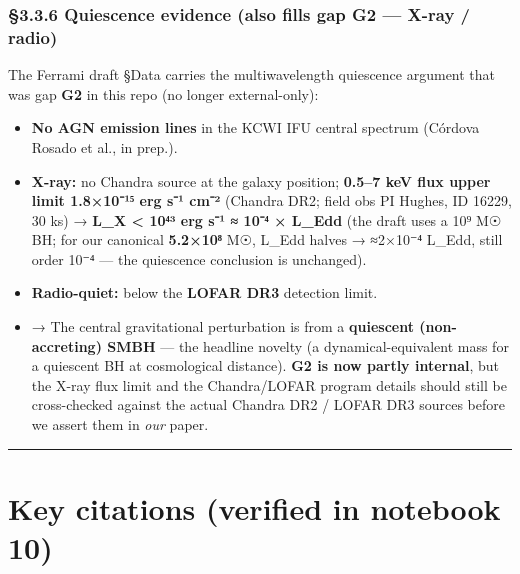 \documentclass[
]{article}
\providecommand{\tightlist}{%
  \setlength{\itemsep}{0pt}\setlength{\parskip}{0pt}}
\begin{document}
\hypertarget{quiescence-evidence-also-fills-gap-g2-x-ray-radio}{%
\subsubsection{§3.3.6 Quiescence evidence (also fills gap G2 --- X-ray /
radio)}\label{quiescence-evidence-also-fills-gap-g2-x-ray-radio}}

The Ferrami draft §Data carries the multiwavelength quiescence argument
that was gap \textbf{G2} in this repo (no longer external-only):

\begin{itemize}
\tightlist
\item
  \textbf{No AGN emission lines} in the KCWI IFU central spectrum
  (Córdova Rosado et al., in prep.).
\item
  \textbf{X-ray:} no Chandra source at the galaxy position;
  \textbf{0.5--7 keV flux upper limit 1.8×10⁻¹⁵ erg s⁻¹ cm⁻²} (Chandra
  DR2; field obs PI Hughes, ID 16229, 30 ks) → \textbf{L\_X \textless{}
  10⁴³ erg s⁻¹ ≈ 10⁻⁴ × L\_Edd} (the draft uses a 10⁹ M☉ BH; for our
  canonical \textbf{5.2×10⁸} M☉, L\_Edd halves → ≈2×10⁻⁴ L\_Edd, still
  order 10⁻⁴ --- the quiescence conclusion is unchanged).
\item
  \textbf{Radio-quiet:} below the \textbf{LOFAR DR3} detection limit.
\item
  → The central gravitational perturbation is from a \textbf{quiescent
  (non-accreting) SMBH} --- the headline novelty (a dynamical-equivalent
  mass for a quiescent BH at cosmological distance). \textbf{G2 is now
  partly internal}, but the X-ray flux limit and the Chandra/LOFAR
  program details should still be cross-checked against the actual
  Chandra DR2 / LOFAR DR3 sources before we assert them in \emph{our}
  paper.
\end{itemize}

\begin{center}\rule{0.5\linewidth}{0.5pt}\end{center}

\hypertarget{key-citations-verified-in-notebook-10}{%
\section{Key citations (verified in notebook
10)}\label{key-citations-verified-in-notebook-10}}
\end{document}
